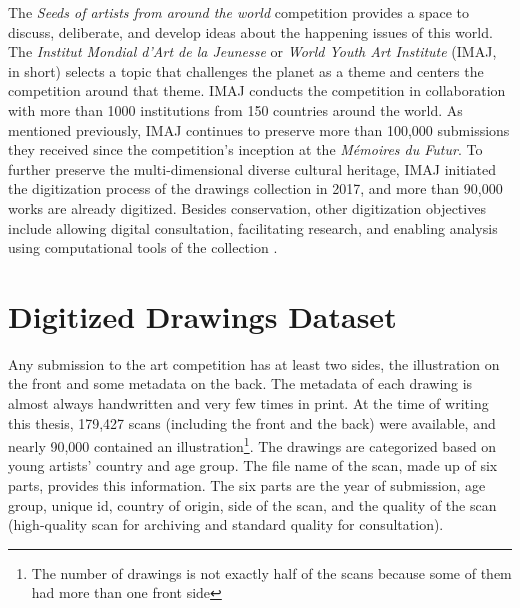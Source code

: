The \textit{Seeds of artists from around the world} competition provides a space to discuss, deliberate, and develop ideas about the happening issues of this world. The \emph{Institut Mondial d'Art de la Jeunesse} or \textit{World Youth Art Institute} (IMAJ, in short) selects a topic that challenges the planet as a theme and centers the competition around that theme. IMAJ conducts the competition in collaboration with more than 1000 institutions from 150 countries around the world. As mentioned previously, IMAJ continues to preserve more than 100,000 submissions they received since the competition's inception at the \textit{Mémoires du Futur}. To further preserve the multi-dimensional diverse cultural heritage, IMAJ initiated the digitization process of the drawings collection in 2017, and more than 90,000 works are already digitized. Besides conservation, other digitization objectives include allowing digital consultation, facilitating research, and enabling analysis using computational tools of the collection \cite{centre_unesco_2020}.


\section{Digitized Drawings Dataset}

Any submission to the art competition has at least two sides, the illustration on the front and some metadata on the back. The metadata of each drawing is almost always handwritten and very few times in print. At the time of writing this thesis, 179,427 scans (including the front and the back) were available, and nearly 90,000 contained an illustration\footnote{The number of drawings is not exactly half of the scans because some of them had more than one front side}. The drawings are categorized based on young artists' country and age group. The file name of the scan, made up of six parts, provides this information. The six parts are the year of submission, age group, unique id, country of origin, side of the scan, and the quality of the scan (high-quality scan for archiving and standard quality for consultation).

